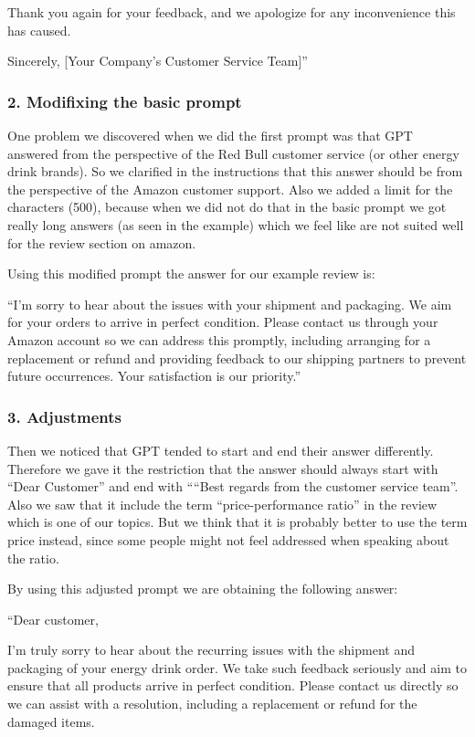 \documentclass[
]{article}
\begin{document}
Thank you again for your feedback, and we apologize for any
inconvenience this has caused.

Sincerely, {[}Your Company's Customer Service Team{]}''

\hypertarget{modifixing-the-basic-prompt}{%
\subsubsection{2. Modifixing the basic
prompt}\label{modifixing-the-basic-prompt}}

One problem we discovered when we did the first prompt was that GPT
answered from the perspective of the Red Bull customer service (or other
energy drink brands). So we clarified in the instructions that this
answer should be from the perspective of the Amazon customer support.
Also we added a limit for the characters (500), because when we did not
do that in the basic prompt we got really long answers (as seen in the
example) which we feel like are not suited well for the review section
on amazon.

Using this modified prompt the answer for our example review is:

``I'm sorry to hear about the issues with your shipment and packaging.
We aim for your orders to arrive in perfect condition. Please contact us
through your Amazon account so we can address this promptly, including
arranging for a replacement or refund and providing feedback to our
shipping partners to prevent future occurrences. Your satisfaction is
our priority.''

\hypertarget{adjustments}{%
\subsubsection{3. Adjustments}\label{adjustments}}

Then we noticed that GPT tended to start and end their answer
differently. Therefore we gave it the restriction that the answer should
always start with ``Dear Customer'' and end with ````Best regards from
the customer service team''. Also we saw that it include the term
``price-performance ratio'' in the review which is one of our topics.
But we think that it is probably better to use the term price instead,
since some people might not feel addressed when speaking about the
ratio.

By using this adjusted prompt we are obtaining the following answer:

``Dear customer,

I'm truly sorry to hear about the recurring issues with the shipment and
packaging of your energy drink order. We take such feedback seriously
and aim to ensure that all products arrive in perfect condition. Please
contact us directly so we can assist with a resolution, including a
replacement or refund for the damaged items.
\end{document}

